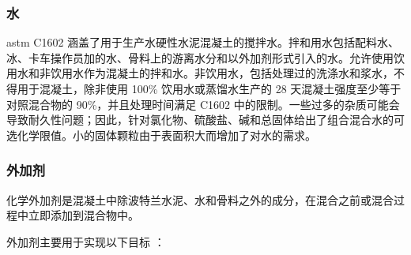 \subsubsection{水}
\acrshort*{astm} C1602 涵盖了用于生产水硬性水泥混凝土的搅拌水。拌和用水包括配料水、冰、卡车操作员加的水、骨料上的游离水分和以外加剂形式引入的水。允许使用饮用水和非饮用水作为混凝土的拌和水。非饮用水，包括处理过的洗涤水和浆水，不得用于混凝土，除非使用 100\% 饮用水或蒸馏水生产的 28 天混凝土强度至少等于对照混合物的 90\%，并且处理时间满足 C1602 中的限制。一些过多的杂质可能会导致耐久性问题；因此，针对氯化物、硫酸盐、碱和总固体给出了组合混合水的可选化学限值。小的固体颗粒由于表面积大而增加了对水的需求。

\subsubsection{外加剂}
化学外加剂是混凝土中除波特兰水泥、水和骨料之外的成分，在混合之前或混合过程中立即添加到混合物中。

外加剂主要用于实现以下目标 \cite{kosmatka2011d}：

